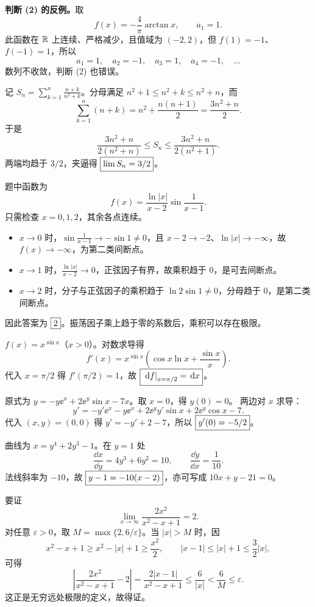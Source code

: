 \textbf{判断 (2) 的反例。}取
\[
f(x)=-\frac4\pi\arctan x,\qquad a_1=1.
\]
此函数在 $\mathbb R$ 上连续、严格减少，且值域为 $(-2,2)$，但 $f(1)=-1$、$f(-1)=1$，所以
\[
a_1=1,\quad a_2=-1,\quad a_3=1,\quad a_4=-1,\quad\ldots
\]
数列不收敛，判断 (2) 也错误。

记 $S_n=\sum_{k=1}^n\frac{n+k}{n^2+k}$。分母满足 $n^2+1\le n^2+k\le n^2+n$，而
\[
\sum_{k=1}^n(n+k)=n^2+\frac{n(n+1)}2=\frac{3n^2+n}2.
\]
于是
\[
\frac{3n^2+n}{2(n^2+n)}\le S_n\le\frac{3n^2+n}{2(n^2+1)}.
\]
两端均趋于 $3/2$，夹逼得 $\boxed{\lim S_n=3/2}$。

题中函数为
\[
f(x)=\frac{\ln|x|}{x-2}\sin\frac1{x-1}.
\]
只需检查 $x=0,1,2$，其余各点连续。
\begin{itemize}
\item $x\to0$ 时，$\sin\frac1{x-1}\to-\sin1\ne0$，且 $x-2\to-2$、$\ln|x|\to-\infty$，故 $f(x)\to-\infty$，为第二类间断点。
\item $x\to1$ 时，$\frac{\ln|x|}{x-2}\to0$，正弦因子有界，故乘积趋于 $0$，是可去间断点。
\item $x\to2$ 时，分子与正弦因子的乘积趋于 $\ln2\sin1\ne0$，分母趋于 $0$，是第二类间断点。
\end{itemize}
因此答案为 $\boxed{2}$。振荡因子乘上趋于零的系数后，乘积可以存在极限。

\newpage
{}
$f(x)=x^{\sin x}$（$x>0$）。对数求导得
\[
f'(x)=x^{\sin x}\left(\cos x\ln x+\frac{\sin x}{x}\right).
\]
代入 $x=\pi/2$ 得 $f'(\pi/2)=1$，故 $\boxed{\left.\,\mathrm d f\right|_{x=\pi/2}=\,\mathrm d x}$。

原式为 $y=-y\ee^x+2\ee^y\sin x-7x$。取 $x=0$，得 $y(0)=0$。
两边对 $x$ 求导：
\[
y'=-y'\ee^x-y\ee^x+2\ee^y y'\sin x+2\ee^y\cos x-7.
\]
代入 $(x,y)=(0,0)$ 得 $y'=-y'+2-7$，所以 $\boxed{y'(0)=-5/2}$。

曲线为 $x=y^4+2y^3-1$。在 $y=1$ 处
\[
\frac{\dd x}{\dd y}=4y^3+6y^2=10,\qquad
\frac{\dd y}{\dd x}=\frac1{10}.
\]
法线斜率为 $-10$，故 $\boxed{y-1=-10(x-2)}$，亦可写成 $10x+y-21=0$。

要证
\[
\lim_{x\to\infty}\frac{2x^2}{x^2-x+1}=2.
\]
对任意 $\varepsilon>0$，取 $M=\max\{2,6/\varepsilon\}$。当 $|x|>M$ 时，因
\[
x^2-x+1\ge x^2-|x|+1\ge\frac{x^2}2,
\qquad |x-1|\le|x|+1\le\frac32|x|,
\]
可得
\[
\left|\frac{2x^2}{x^2-x+1}-2\right|
=\frac{2|x-1|}{x^2-x+1}\le\frac6{|x|}<\frac6M\le\varepsilon.
\]
这正是无穷远处极限的定义，故得证。

